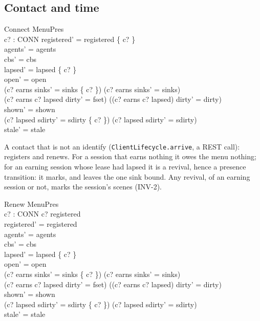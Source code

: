 \documentclass[a4paper,10pt,fleqn]{article}
\begin{document}
\subsection{Contact and time}

\begin{schema}{Connect}
  \Delta MenuPres \\
  c? : CONN
\where
  registered' = registered \cup \{ c? \} \\
  agents' = agents \\
  cbs' = cbs \\
  lapsed' = lapsed \setminus \{ c? \} \\
  open' = open \\
  (c? \in earns \land sinks' = sinks \oplus \{ c?  \}) \lor
    (c? \notin earns \land sinks' = sinks) \\
  (c? \in earns \land c? \in lapsed \land dirty' = fset) \lor
    (\lnot (c? \in earns \land c? \in lapsed) \land dirty' = dirty) \\
  shown' = shown \\
  (c? \in lapsed \land sdirty' = sdirty \cup \{ c? \}) \lor
    (c? \notin lapsed \land sdirty' = sdirty) \\
  stale' = stale
\end{schema}

A contact that is not an identify (\texttt{ClientLifecycle.arrive}, a REST
call): registers and renews. For a session that earns nothing it owes the menu
nothing; for an earning session whose lease had lapsed it is a revival, hence a
presence transition: it marks, and leaves the one sink bound. Any revival, of
an earning session or not, marks the session's scenes (INV-2).

\begin{schema}{Renew}
  \Delta MenuPres \\
  c? : CONN
\where
  c? \in registered \\
  registered' = registered \\
  agents' = agents \\
  cbs' = cbs \\
  lapsed' = lapsed \setminus \{ c? \} \\
  open' = open \\
  (c? \in earns \land sinks' = sinks \oplus \{ c?  \}) \lor
    (c? \notin earns \land sinks' = sinks) \\
  (c? \in earns \land c? \in lapsed \land dirty' = fset) \lor
    (\lnot (c? \in earns \land c? \in lapsed) \land dirty' = dirty) \\
  shown' = shown \\
  (c? \in lapsed \land sdirty' = sdirty \cup \{ c? \}) \lor
    (c? \notin lapsed \land sdirty' = sdirty) \\
  stale' = stale
\end{schema}
\end{document}
